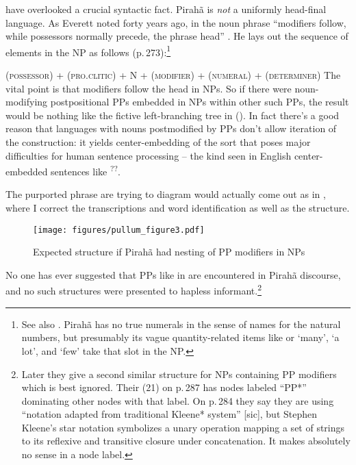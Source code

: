 \documentclass[output=paper,colorlinks,citecolor=brown
]{langscibook}
\begin{document}
\citet{SandaloEtAl18} have overlooked a crucial syntactic fact. Pirahã is
\emph{not} a uniformly head-final language. As Everett noted forty
years ago, in the noun phrase ``modifiers follow, while possessors normally
precede, the phrase head'' \citep[272]{Everett86HAL}. He lays out
the sequence of elements in the NP as follows (p.\,273):\footnote{%
   See also . Pirahã has no true
   numerals in the sense of names for the natural numbers, but presumably
   its vague quantity-related items like  or
    `many',
    `a lot', and
    `few' take that slot in the NP.}

\ea
(\textsc{possessor}) + (\textsc{pro.clitic}) + N + (\textsc{modifier})
+ (\textsc{numeral}) + (\textsc{determiner})
\label{ex:pullum:6}
\z
\medskip\noindent
The vital point is that modifiers follow the head in NPs. So if there
were noun-modifying postpositional PPs embedded in NPs within other
such PPs, the result would be nothing like the fictive left-branching
tree in (). In fact there's a good reason that languages with nouns
postmodified by PPs don't allow iteration of the construction: it
yields center-embedding of the sort that poses major difficulties for
human sentence processing -- the kind seen in English center-embedded
sentences like \textsuperscript{??}.

The purported phrase \citet{SandaloEtAl18} are trying to diagram would
actually come out as in , where I correct the transcriptions
and word identification as well as the structure.

\begin{figure}
\texttt{[image: figures/pullum\_figure3.pdf]}
\caption{Expected structure if Pirahã had nesting of PP modifiers in NPs}
\label{fig:pullum:2}
\end{figure}

No one has ever suggested that PPs like in  are encountered 
in Pirahã
discourse, and no such structures were presented to 
hapless informant.\footnote{%
   Later they give a second similar structure for NPs containing PP
   modifiers which is best ignored. Their (21) on p.\,287 has nodes
   labeled ``PP*'' dominating other nodes with that label. On p.\,284
   they say they are using ``notation adapted from traditional Kleene*
   system'' [sic], but Stephen Kleene's star notation symbolizes a
   unary operation mapping a set of strings to its reflexive and
   transitive closure under concatenation. It makes absolutely no
   sense in a node label.}
\end{document}
